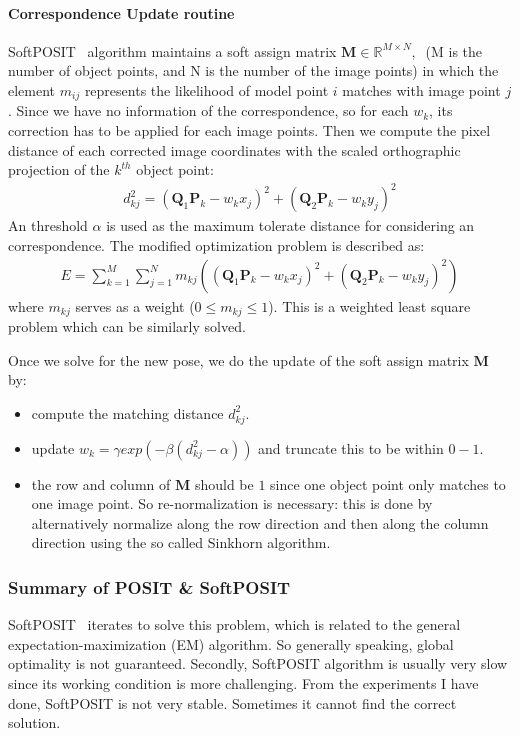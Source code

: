 \documentclass[a4paper]{report}
\begin{document}
\paragraph{Correspondence Update routine}
SoftPOSIT~\cite{softposit} algorithm maintains a soft assign matrix $\mathbf{M} \in \mathbb{R}^{M\times N},\ $ (M is the number of object points, and N is the number of the image points) in which the element $m_{ij}$ represents the likelihood of model point $i$ matches with image point $j$. Since we have no information of the correspondence, so for each $w_k$, its correction has to be applied for each image points. Then we compute the pixel distance of each corrected image coordinates with the scaled orthographic projection of the $k^{th}$ object point:
\begin{align*}
d_{kj}^2=(\mathbf{Q}_1\mathbf{P}_k-w_k x_j)^2 + (\mathbf{Q}_2\mathbf{P}_k-w_k y_j)^2
\end{align*}
An threshold $\alpha$ is used as the maximum tolerate distance for considering an correspondence. The modified optimization problem is described as:
\begin{align*}
E=\sum_{k=1}^{M}\sum_{j=1}^{N}m_{kj}\left(
\left(
\mathbf{Q}_1\mathbf{P}_k-w_k x_j
\right)^2+
\left(
\mathbf{Q}_2\mathbf{P}_k-w_k y_j
\right)^2
\right)
\end{align*}
where $m_{kj}$ serves as a weight ($0 \leq m_{kj} \leq 1$). This is a weighted least square problem which can be similarly solved. 

Once we solve for the new pose, we do the update of the soft assign matrix $\mathbf{M}$ by:
\begin{itemize}
	\item compute the matching distance $d_{kj}^2$.
	\item update $w_k=\gamma exp(-\beta(d_{kj}^2-\alpha))$ and truncate this to be within $0-1$.
	\item the row and column of $\mathbf{M}$ should be $1$ since one object point only matches to one image point. So re-normalization is necessary: this is done by alternatively normalize along the row direction and then along the column direction using the so called Sinkhorn algorithm.
\end{itemize}

\subsubsection{Summary of POSIT \& SoftPOSIT}
SoftPOSIT~\cite{softposit} iterates to solve this problem, which is related to the general expectation-maximization (EM) algorithm. So generally speaking, global optimality is not guaranteed. Secondly, SoftPOSIT algorithm is usually very slow since its working condition is more challenging. From the experiments I have done, SoftPOSIT is not very stable. Sometimes it cannot find the correct solution.
\end{document}
